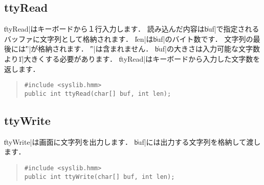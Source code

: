 \subsection{ttyRead}

\|ttyRead|はキーボードから１行入力します．
読み込んだ内容は\|buf|で指定されるバッファに文字列として格納されます．
\|len|は\|buf|のバイト数です．
文字列の最後には\|'\0'|が格納されます．
\|'\n'|は含まれません．
\|buf|の大きさは入力可能な文字数より\|1|大きくする必要があります．
\|ttyRead|はキーボードから入力した文字数を返します．

\begin{quote}
\begin{verbatim}
#include <syslib.hmm>
public int ttyRead(char[] buf, int len);
\end{verbatim}
\end{quote}

\subsection{ttyWrite}

\|ttyWrite|は画面に文字列を出力します．
\|buf|には出力する文字列を格納して渡します．

\begin{quote}
\begin{verbatim}
#include <syslib.hmm>
public int ttyWrite(char[] buf, int len);
\end{verbatim}
\end{quote}
